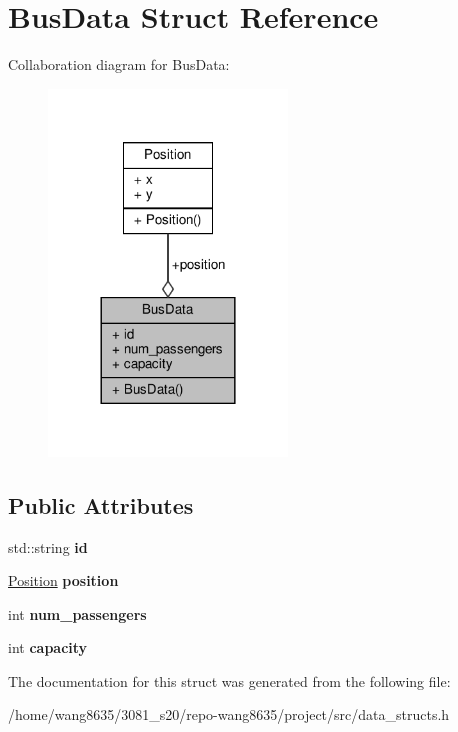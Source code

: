 \hypertarget{structBusData}{}\section{Bus\+Data Struct Reference}
\label{structBusData}


Collaboration diagram for Bus\+Data\+:\nopagebreak
\begin{figure}[H]
\begin{center}
\leavevmode
\includegraphics[width=180pt]{structBusData__coll__graph}
\end{center}
\end{figure}
\subsection*{Public Attributes}
\begin{DoxyCompactItemize}
\item 
\mbox{\label{structBusData_aaae4f1be20f1ee54bb4dd773b8580069}} 
std\+::string {\bfseries id}
\item 
\mbox{\label{structBusData_ae56b05c0d23a89ced4a0333bd65f0c96}} 
\hyperlink{structPosition}{Position} {\bfseries position}
\item 
\mbox{\label{structBusData_a4293fd5e2ffdcdd1b02a9e56f27230ec}} 
int {\bfseries num\+\_\+passengers}
\item 
\mbox{\label{structBusData_a84ea609f6ecc9b96e1ce37b47d2127a1}} 
int {\bfseries capacity}
\end{DoxyCompactItemize}


The documentation for this struct was generated from the following file\+:\begin{DoxyCompactItemize}
\item 
/home/wang8635/3081\+\_\+s20/repo-\/wang8635/project/src/data\+\_\+structs.\+h\end{DoxyCompactItemize}
